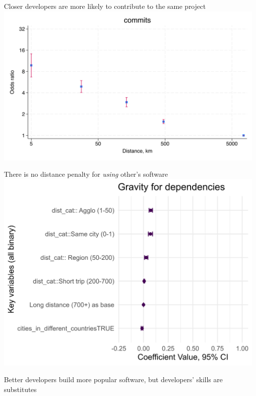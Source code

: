\documentclass[
  ignorenonframetext,
  aspectratio=169,
]{beamer}
\begin{document}
\begin{frame}{Closer developers are more likely to contribute to the
same project}
\protect\hypertarget{closer-developers-are-more-likely-to-contribute-to-the-same-project}{}
\includegraphics{figures/commits_gravity.png}
\end{frame}

\begin{frame}{There is no distance penalty for \emph{using} other's
software}
\protect\hypertarget{there-is-no-distance-penalty-for-using-others-software}{}
\includegraphics{figures/gravity_dependencies2.png}
\end{frame}

\begin{frame}{Better developers build more popular software, but
developers' skills are substitutes}
\protect\hypertarget{better-developers-build-more-popular-software-but-developers-skills-are-substitutes}{}
\vspace*{-2ex}\hspace*{-2em}
\end{frame}
\end{document}
